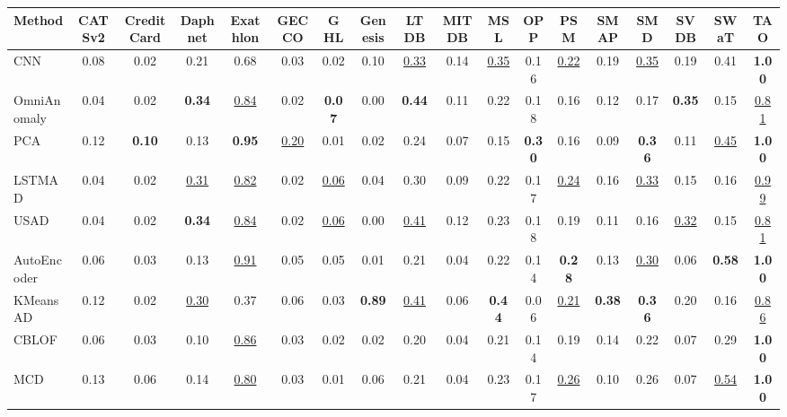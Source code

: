 \documentclass[border=2pt]{standalone}
\begin{document}
\renewcommand{\arraystretch}{1.05}
\setlength{\tabcolsep}{2.5pt}
\small

\begin{tabular}{l|ccccccccccccccccc}
\toprule
\textbf{Method} & \textbf{CATSv2} & \textbf{CreditCard} & \textbf{Daphnet} & \textbf{Exathlon} & \textbf{GECCO} & \textbf{GHL} & \textbf{Genesis} & \textbf{LTDB} & \textbf{MITDB} & \textbf{MSL} & \textbf{OPP} & \textbf{PSM} & \textbf{SMAP} & \textbf{SMD} & \textbf{SVDB} & \textbf{SWaT} & \textbf{TAO} \\
\midrule
CNN                    & 0.08 & 0.02 & 0.21 & 0.68 & 0.03 & 0.02 & 0.10 & \underline{0.33} & 0.14 & \underline{0.35} & 0.16 & \underline{0.22} & 0.19 & \underline{0.35} & 0.19 & 0.41 & \textbf{1.00} \\
OmniAnomaly            & 0.04 & 0.02 & \textbf{0.34} & \underline{0.84} & 0.02 & \textbf{0.07} & 0.00 & \textbf{0.44} & 0.11 & 0.22 & 0.18 & 0.16 & 0.12 & 0.17 & \textbf{0.35} & 0.15 & \underline{0.81} \\
PCA                    & 0.12 & \textbf{0.10} & 0.13 & \textbf{0.95} & \underline{0.20} & 0.01 & 0.02 & 0.24 & 0.07 & 0.15 & \textbf{0.30} & 0.16 & 0.09 & \textbf{0.36} & 0.11 & \underline{0.45} & \textbf{1.00} \\
LSTMAD                 & 0.04 & 0.02 & \underline{0.31} & \underline{0.82} & 0.02 & \underline{0.06} & 0.04 & 0.30 & 0.09 & 0.22 & 0.17 & \underline{0.24} & 0.16 & \underline{0.33} & 0.15 & 0.16 & \underline{0.99} \\
USAD                   & 0.04 & 0.02 & \textbf{0.34} & \underline{0.84} & 0.02 & \underline{0.06} & 0.00 & \underline{0.41} & 0.12 & 0.23 & 0.18 & 0.19 & 0.11 & 0.16 & \underline{0.32} & 0.15 & \underline{0.81} \\
AutoEncoder            & 0.06 & 0.03 & 0.13 & \underline{0.91} & 0.05 & 0.05 & 0.01 & 0.21 & 0.04 & 0.22 & 0.14 & \textbf{0.28} & 0.13 & \underline{0.30} & 0.06 & \textbf{0.58} & \textbf{1.00} \\
KMeansAD               & 0.12 & 0.02 & \underline{0.30} & 0.37 & 0.06 & 0.03 & \textbf{0.89} & \underline{0.41} & 0.06 & \textbf{0.44} & 0.06 & \underline{0.21} & \textbf{0.38} & \textbf{0.36} & 0.20 & 0.16 & \underline{0.86} \\
CBLOF                  & 0.06 & 0.03 & 0.10 & \underline{0.86} & 0.03 & 0.02 & 0.02 & 0.20 & 0.04 & 0.21 & 0.14 & 0.19 & 0.14 & 0.22 & 0.07 & 0.29 & \textbf{1.00} \\
MCD                    & 0.13 & 0.06 & 0.14 & \underline{0.80} & 0.03 & 0.01 & 0.06 & 0.21 & 0.04 & 0.23 & 0.17 & \underline{0.26} & 0.10 & 0.26 & 0.07 & \underline{0.54} & \textbf{1.00} \\

\end{tabular}
\end{document}
